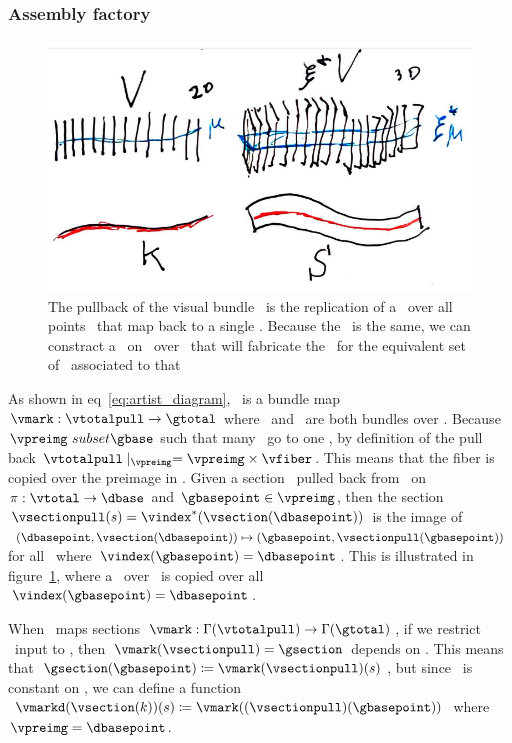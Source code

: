 \documentclass[../main.tex]{subfiles}
\begin{document}
\subsubsection{Assembly factory \vmarkd}
\begin{figure}
    \includegraphics[width=.75\textwidth]{figures/math/q_hat.png}
    \caption{The pullback of the visual bundle \vtotalpull\ is the replication of a \vsection\ over all points \gbasepoint\ that map back to a single \dbasepoint. Because the \vsection\ is the same, we can constract a \vmarkd\ on \vsection\ over \dbasepoint\ that will fabricate the \vmark\ for the equivalent set of \gbasepoint\ associated to that \dbasepoint}
    \label{fig:artist_q_hat}
\end{figure}
As shown in eq~\ref{eq:artist_diagram}, \vmark\ is a bundle map $\vmark: \vtotalpull\rightarrow \gtotal$ where \vtotalpull\ and \gtotal\ are both bundles over \gbase. Because $\vpreimg\ subset \gbase$ such that many \gbasepoint\ go to one \dbasepoint, by definition of the pull back $\vtotalpull \mid_{\vpreimg} = \vpreimg \times \vfiber$. This means that the fiber \vtotal is copied over the preimage in \vpreimg. Given a section \vsectionpull\ pulled back from \vsection\ on $\pi:\vtotal\rightarrow\dbase$ and $\gbasepoint \in \vpreimg$, then the section $\vsectionpull(s) = \vindex^*(\vsection(\dbasepoint))$ is the image of $(\dbasepoint, \vsection(\dbasepoint)) \mapsto (\gbasepoint, \vsectionpull(\gbasepoint))$ for all \gbasepoint\ where $\vindex(\gbasepoint) = \dbasepoint$. This is illustrated in figure~\ref{fig:artist_q_hat}, where a \vsection\ over \dbasepath\ is copied over all  $\vindex(\gbasepoint) = \dbasepoint$. 

When \vmark\ maps sections $\vmark: \Gamma(\vtotalpull) \rightarrow \Gamma(\gtotal)$, if we restrict \vmark\ input to \vsectionpull, then $\vmark(\vsectionpull) = \gsection$ depends on \gbasepoint. This means that $\gsection(\gbasepoint) \coloneqq \vmark(\vsectionpull)(s)$, but since \vsectionpull\ is constant on \vpreimg, we can define a function $\vmarkd(\vsection(k))(s) \coloneqq \vmark((\vsectionpull)(\gbasepoint))$ where $\vpreimg = \dbasepoint$. 
\end{document}

